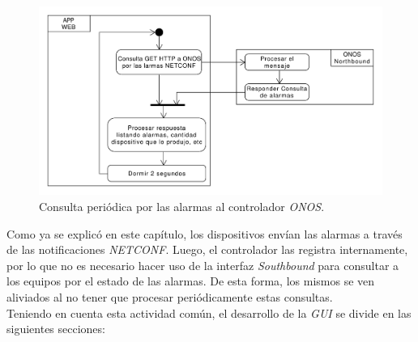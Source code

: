 \begin{figure}[H]
    \centering
    \includegraphics[scale=0.45]{Figures/consulta_alarmas.pdf}
    \caption{Consulta periódica por las alarmas al controlador \textit{ONOS}.}
    \label{fig:consulta_alarmas}
  \end{figure}

  Como ya se explicó en este capítulo, los dispositivos envían las alarmas a través de las notificaciones \textit{NETCONF}. Luego, el controlador las registra internamente, por lo que no es necesario hacer uso de la interfaz \textit{Southbound} para consultar a los equipos por el estado de las alarmas. De esta forma, los mismos se ven aliviados al no tener que procesar periódicamente estas consultas.
  \\

  Teniendo en cuenta esta actividad común, el desarrollo de la \textit{GUI} se divide en las siguientes secciones:

